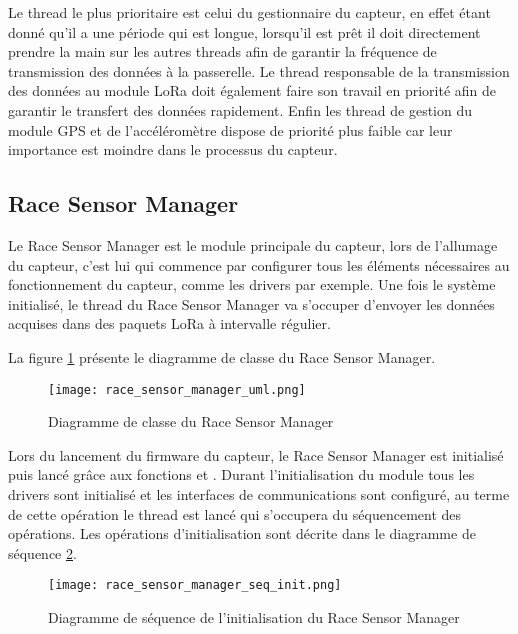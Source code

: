 Le thread le plus prioritaire est celui du gestionnaire du capteur, en effet étant donné qu'il a une période qui est longue, lorsqu'il est prêt il doit directement prendre la main sur les autres threads afin de garantir la fréquence de transmission des données à la passerelle.
Le thread responsable de la transmission des données au module LoRa doit également faire son travail en priorité afin de garantir le transfert des données rapidement.
Enfin les thread de gestion du module GPS et de l'accéléromètre dispose de priorité plus faible car leur importance est moindre dans le processus du capteur.

\subsection{Race Sensor Manager}

Le Race Sensor Manager est le module principale du capteur, lors de l'allumage du capteur, c'est lui qui commence par configurer tous les éléments nécessaires au fonctionnement du capteur, comme les drivers par exemple. Une fois le système initialisé, le thread du Race Sensor Manager va s'occuper d'envoyer les données acquises dans des paquets LoRa à intervalle régulier.

La figure \ref{fig:race_sensor_manager_uml} présente le diagramme de classe du Race Sensor Manager.

\begin{figure}[htb]
\centering 
\texttt{[image: race\_sensor\_manager\_uml.png]} 
\caption{Diagramme de classe du Race Sensor Manager}
\label{fig:race_sensor_manager_uml}
\end{figure}

Lors du lancement du firmware du capteur, le Race Sensor Manager est initialisé puis lancé grâce aux fonctions  et . Durant l'initialisation du module tous les drivers sont initialisé et les interfaces de communications sont configuré, au terme de cette opération le thread est lancé qui s'occupera du séquencement des opérations. Les opérations d'initialisation sont décrite dans le diagramme de séquence \ref{fig:race_sensor_manager_init_seq}.

\begin{figure}[htb]
\centering 
\texttt{[image: race\_sensor\_manager\_seq\_init.png]} 
\caption{Diagramme de séquence de l'initialisation du Race Sensor Manager}
\label{fig:race_sensor_manager_init_seq}
\end{figure}

